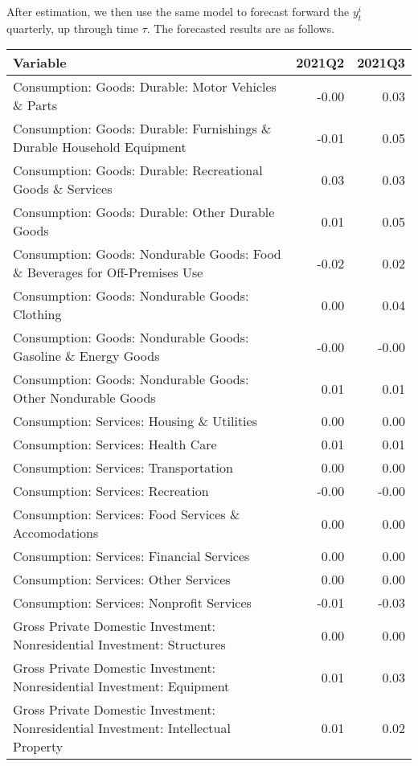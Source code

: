 \documentclass[11pt, letterpaper]{article}\usepackage[]{graphicx}\usepackage[]{color}
\begin{document}
After estimation, we then use the same model to forecast forward the $y^i_t$ quarterly, up through time $\tau$. 
The forecasted results are as follows.
\begin{table}[H]
\centering
\begingroup\scriptsize
\begin{tabular}{lrr}
  \hline
Variable & 2021Q2 & 2021Q3 \\ 
  \hline
Consumption: Goods: Durable: Motor Vehicles \& Parts & -0.00 & 0.03 \\ 
  Consumption: Goods: Durable: Furnishings \& Durable Household Equipment & -0.01 & 0.05 \\ 
  Consumption: Goods: Durable: Recreational Goods \& Services & 0.03 & 0.03 \\ 
  Consumption: Goods: Durable: Other Durable Goods & 0.01 & 0.05 \\ 
  Consumption: Goods: Nondurable Goods: Food \& Beverages for Off-Premises Use & -0.02 & 0.02 \\ 
  Consumption: Goods: Nondurable Goods: Clothing & 0.00 & 0.04 \\ 
  Consumption: Goods: Nondurable Goods: Gasoline \& Energy Goods & -0.00 & -0.00 \\ 
  Consumption: Goods: Nondurable Goods: Other Nondurable Goods & 0.01 & 0.01 \\ 
  Consumption: Services: Housing \& Utilities & 0.00 & 0.00 \\ 
  Consumption: Services: Health Care & 0.01 & 0.01 \\ 
  Consumption: Services: Transportation & 0.00 & 0.00 \\ 
  Consumption: Services: Recreation & -0.00 & -0.00 \\ 
  Consumption: Services: Food Services \& Accomodations & 0.00 & 0.00 \\ 
  Consumption: Services: Financial Services & 0.00 & 0.00 \\ 
  Consumption: Services: Other Services & 0.00 & 0.00 \\ 
  Consumption: Services: Nonprofit Services & -0.01 & -0.03 \\ 
  Gross Private Domestic Investment: Nonresidential Investment: Structures & 0.00 & 0.00 \\ 
  Gross Private Domestic Investment: Nonresidential Investment: Equipment & 0.01 & 0.03 \\ 
  Gross Private Domestic Investment: Nonresidential Investment: Intellectual Property & 0.01 & 0.02 \\ 

\end{tabular}
\end{table}
\end{document}
